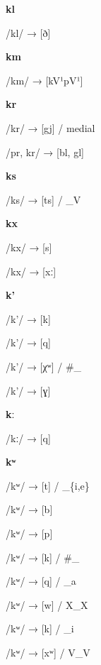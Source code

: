 \begin{center}\textbf{kl}\end{center}
\begin{multicols}{4}
\noindent /kl/ → [ð]
\end{multicols}



\begin{center}\textbf{km}\end{center}
\begin{multicols}{4}
\noindent /km/ → [kV¹pV¹]
\end{multicols}


\begin{center}\textbf{kr}\end{center}
\begin{multicols}{4}
\noindent /kr/ → [gj] / medial

\noindent /pr, kr/ → [bl, gl]
\end{multicols}


\begin{center}\textbf{ks}\end{center}
\begin{multicols}{4}
\noindent /ks/ → [ts] / \_V
\end{multicols}



\begin{center}\textbf{kx}\end{center}
\begin{multicols}{4}
\noindent /kx/ → [s]

\noindent /kx/ → [xː]
\end{multicols}

\begin{center}\textbf{k'}\end{center}
\begin{multicols}{4}
\noindent /k'/ → [k]

\noindent /k'/ → [q]

\noindent /k'/ → [χʷ] / \#\_

\noindent /k'/ → [ɣ]
\end{multicols}

\begin{center}\textbf{kː}\end{center}
\begin{multicols}{4}
\noindent /kː/ → [q]

\end{multicols}

\begin{center}\textbf{kʷ}\end{center}
\begin{multicols}{4}
\noindent /kʷ/ → [t] / \_\{i,e\}

\noindent /kʷ/ → [b]

\noindent /kʷ/ → [p]

\noindent /kʷ/ → [k] / \#\_

\noindent /kʷ/ → [q] / \_a

\noindent /kʷ/ → [w] / X\_X

\noindent /kʷ/ → [k] / \_i

\noindent /kʷ/ → [xʷ] / V\_V

\end{multicols}

